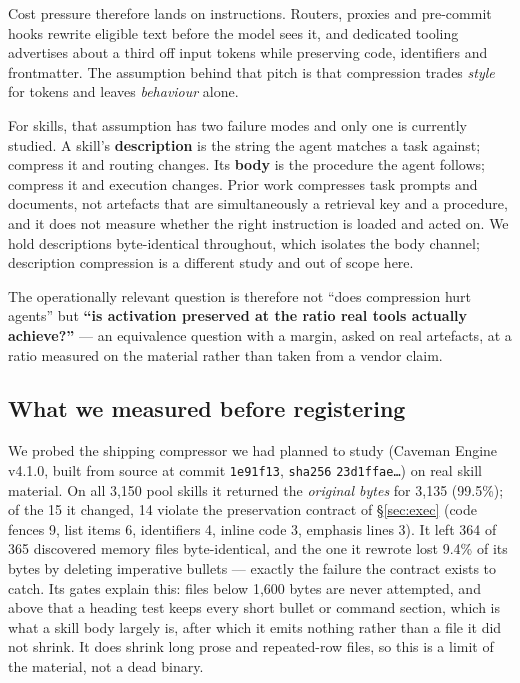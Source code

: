 \documentclass[10pt,conference]{IEEEtran}
\begin{document}
Cost pressure therefore lands on instructions. Routers, proxies and pre-commit hooks rewrite eligible text before the model sees it, and dedicated tooling advertises about a third off input tokens while preserving code, identifiers and frontmatter. The assumption behind that pitch is that compression trades \emph{style} for tokens and leaves \emph{behaviour} alone.

For skills, that assumption has two failure modes and only one is currently studied. A skill's \textbf{description} is the string the agent matches a task against; compress it and routing changes. Its \textbf{body} is the procedure the agent follows; compress it and execution changes. Prior work compresses task prompts and documents, not artefacts that are simultaneously a retrieval key and a procedure, and it does not measure whether the right instruction is loaded and acted on. We hold descriptions byte-identical throughout, which isolates the body channel; description compression is a different study and out of scope here.

The operationally relevant question is therefore not ``does compression hurt agents'' but \textbf{``is activation preserved at the ratio real tools actually achieve?''} --- an equivalence question with a margin, asked on real artefacts, at a ratio measured on the material rather than taken from a vendor claim.

\subsection{What we measured before registering}
We probed the shipping compressor we had planned to study (Caveman Engine v4.1.0, built from source at commit \texttt{1e91f13}, \texttt{sha256} \texttt{23d1ffae\ldots}) on real skill material. On all 3{,}150 pool skills it returned the \emph{original bytes} for 3{,}135 (99.5\%); of the 15 it changed, 14 violate the preservation contract of \S\ref{sec:exec} (code fences 9, list items 6, identifiers 4, inline code 3, emphasis lines 3). It left 364 of 365 discovered memory files byte-identical, and the one it rewrote lost 9.4\% of its bytes by deleting imperative bullets --- exactly the failure the contract exists to catch. Its gates explain this: files below 1{,}600 bytes are never attempted, and above that a heading test keeps every short bullet or command section, which is what a skill body largely is, after which it emits nothing rather than a file it did not shrink. It does shrink long prose and repeated-row files, so this is a limit of the material, not a dead binary.
\end{document}
